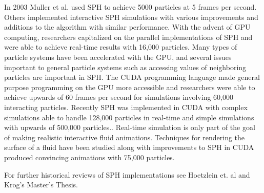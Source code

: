 In 2003 Muller et al. used SPH to achieve 5000 particles at 5 frames per
second\cite{Muller2003}.  Others implemented interactive SPH simulations with
various improvements and additions to the algorithm with similar
performance.\cite{Kallin2009}\cite{Kelager2006}
With the advent of GPU computing, researchers capitalized on the parallel
implementations of SPH and were able to achieve real-time results with 16,000 particles.\cite{Harada2007a}
Many types of particle systems have been accelerated with the GPU, and several issues
important to general particle systems such as accessing values of neighboring
particles are important in SPH.\cite{Knowles2009}
The CUDA programming language made general purpose programming on the GPU more
accessible and researchers were able to achieve upwards of 60 frames per second
for simulations involving 60,000 interacting particles.\cite{Seizinger2010}
Recently SPH was implemented in CUDA with complex simulations able to handle
128,000 particles in real-time and simple simulations with upwards of 500,000
particles.\cite{Krog2010}. Real-time simulation is only part of the goal of making
realistic interactive fluid animations. Techniques for rendering the
surface of a fluid have been studied along with improvements to SPH in CUDA 
produced convincing animations with 75,000 particles.\cite{Goswami2010} 


For further historical reviews of SPH implementations see Hoetzlein et.
al\cite{Hoetzlein} and Krog's Master's Thesis.\cite{Krog2010}



